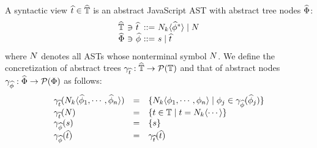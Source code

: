 A syntactic view $\widehat{t} \in \widehat{\mathbb{T}}$ is an abstract JavaScript AST with
abstract tree nodes $\widehat{\Phi}$:
\[
  \begin{array}{l@{~}c@{~}l@{~}c@{~}l}
    \atreeset &\ni& \atree &::=& \nt_k \langle \anode^* \rangle \mid \nt\\
    \anodeset &\ni& \anode &::=& \str \mid \atree\\
  \end{array}
\]
where $N$ denotes all ASTs whose nonterminal symbol $N$. We define the
concretization of abstract trees $\gamma_{\widehat{t}}: \widehat{\mathbb{T}} \rightarrow
\mathcal{P}(\mathbb{T})$ and that of abstract nodes $\gamma_{\widehat{\phi}}: \widehat{\Phi}
\rightarrow \mathcal{P}(\Phi)$ as follows:
\[
  \begin{array}{lcl}
    \gamma_{\widehat{t}}(N_k \langle \widehat{\phi}_1, \cdots, \widehat{\phi}_n \rangle) &=&
    \{ N_k \langle \phi_1, \cdots, \phi_n \rangle \mid \phi_j \in
    \gamma_{\widehat{\phi}}(\widehat{\phi}_j) \}\\

    \gamma_{\widehat{t}}(N) &=&
    \{ t \in \mathbb{T} \mid t = N_k \langle \cdots \rangle \}\\

    \gamma_{\widehat{\phi}}(s) &=& \{ s \}\\

    \gamma_{\widehat{\phi}}(\widehat{t}) &=& \gamma_{\widehat{t}}(\widehat{t})\\
  \end{array}
\]
% 
% 
% 
% 
% 
